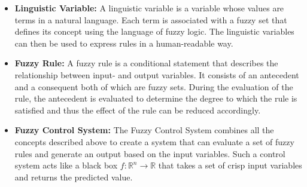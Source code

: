 \begin{itemize}
  \item \textbf{Linguistic Variable:} A linguistic variable is a variable whose values are terms in a natural language. Each term is associated with a fuzzy set that defines its concept using the language of fuzzy logic. The linguistic variables can then be used to express rules in a human-readable way.

  \item \textbf{Fuzzy Rule:} A fuzzy rule is a conditional statement that describes the relationship between input- and output variables. It consists of an antecedent and a consequent both of which are fuzzy sets. During the evaluation of the rule, the antecedent is evaluated to determine the degree to which the rule is satisfied and thus the effect of the rule can be reduced accordingly.

  \item \textbf{Fuzzy Control System:} The Fuzzy Control System combines all the concepts described above to create a system that can evaluate a set of fuzzy rules and generate an output based on the input variables. Such a control system acts like a black box $f: \mathbb{R}^n \rightarrow \mathbb{R}$ that takes a set of crisp input variables and returns the predicted value.
\end{itemize}





\newcommand{\fuzzySetNodeOneD}[4]{
  \begin{tikzpicture}
    \begin{axis}%
      [
        axis line style={black},
        width=4.5cm,
        height=3cm,
        axis lines=center,
        xlabel={#1},
        x label style={at={(axis description cs:0.9,0.25)},anchor=north},
        ylabel=$\mu$,
        y label style={at={(axis description cs:0.5,1)},anchor=south},
        xmin=-6,
        xmax=6,
        ytick={},
        yticklabels={},
        extra x ticks={0},
        extra x tick labels={#3},
        ymax=1,
        samples=25,
        extra y ticks={1},
        every axis plot/.append style={thick}
      ]
      \addplot[red]  {#4};
    \end{axis}
    \node[above,font=\large\bfseries,inner sep=5pt] at (current bounding box.north) {\shortstack{FuzzySet\\#2}};
  \end{tikzpicture}
}


